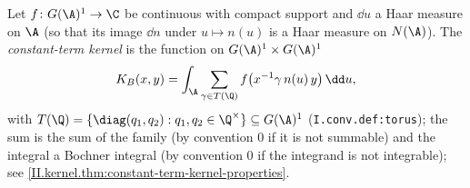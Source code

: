 Let $f\colon G(\A)^1\to\C$ be continuous with compact support and $\dd u$ a Haar measure on $\A$ (so that its image $\dd n$ under
$u\mapsto n(u)$ is a Haar measure on $N(\A)$). The \emph{constant-term kernel} is the function on $G(\A)^1\times G(\A)^1$
\[
  K_B(x,y)=\int_\A\sum_{\gamma\in T(\Q)}f\bigl(x^{-1}\gamma\,n(u)\,y\bigr)\,\dd u,
\]
with $T(\Q)=\{\diag(q_1,q_2):q_1,q_2\in\Q^\times\}\subseteq G(\A)^1$ (\texttt{I.conv.def:torus}); the sum is the sum of the family (by convention $0$ if it is not summable) and the integral a
Bochner integral (by convention $0$ if the integrand is not integrable); see \cref{II.kernel.thm:constant-term-kernel-properties}.
